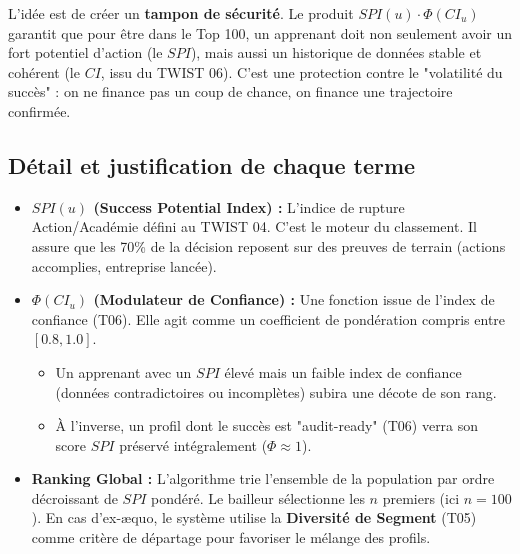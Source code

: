 \documentclass[11pt,a4paper]{article}
\begin{document}
L'idée est de créer un \textbf{tampon de sécurité}. Le produit $SPI(u) \cdot \Phi(CI_u)$ garantit que pour être dans le Top 100, un apprenant doit non seulement avoir un fort potentiel d'action (le $SPI$), mais aussi un historique de données stable et cohérent (le $CI$, issu du TWIST 06). C'est une protection contre le "volatilité du succès" : on ne finance pas un coup de chance, on finance une trajectoire confirmée.

\subsection{Détail et justification de chaque terme}
\begin{itemize}
    \item \textbf{$SPI(u)$ (Success Potential Index) :} 
    L'indice de rupture Action/Académie défini au TWIST 04. C'est le moteur du classement. Il assure que les 70\% de la décision reposent sur des preuves de terrain (actions accomplies, entreprise lancée).
    
    \item \textbf{$\Phi(CI_u)$ (Modulateur de Confiance) :} 
    Une fonction issue de l'index de confiance (T06). Elle agit comme un coefficient de pondération compris entre $[0.8, 1.0]$. 
    \begin{itemize}
        \item Un apprenant avec un $SPI$ élevé mais un faible index de confiance (données contradictoires ou incomplètes) subira une décote de son rang.
        \item À l'inverse, un profil dont le succès est "audit-ready" (T06) verra son score $SPI$ préservé intégralement ($\Phi \approx 1$).
    \end{itemize}

    \item \textbf{Ranking Global :} 
    L'algorithme trie l'ensemble de la population par ordre décroissant de $SPI$ pondéré. Le bailleur sélectionne les $n$ premiers (ici $n=100$). En cas d'ex-\ae quo, le système utilise la \textbf{Diversité de Segment} (T05) comme critère de départage pour favoriser le mélange des profils.
\end{itemize}
\end{document}
